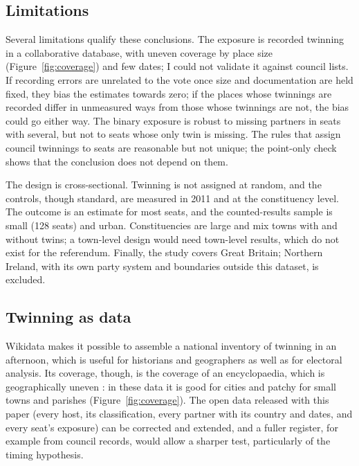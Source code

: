 \documentclass[11pt,a4paper]{article}
\begin{document}
\subsection{Limitations}
Several limitations qualify these conclusions. The exposure is recorded twinning in a collaborative database, with uneven coverage by place size (Figure~\ref{fig:coverage}) and few dates; I could not validate it against council lists. If recording errors are unrelated to the vote once size and documentation are held fixed, they bias the estimates towards zero; if the places whose twinnings are recorded differ in unmeasured ways from those whose twinnings are not, the bias could go either way. The binary exposure is robust to missing partners in seats with several, but not to seats whose only twin is missing. The rules that assign council twinnings to seats are reasonable but not unique; the point-only check shows that the conclusion does not depend on them.

The design is cross-sectional. Twinning is not assigned at random, and the controls, though standard, are measured in 2011 and at the constituency level. The outcome is an estimate for most seats, and the counted-results sample is small (128 seats) and urban. Constituencies are large and mix towns with and without twins; a town-level design would need town-level results, which do not exist for the referendum. Finally, the study covers Great Britain; Northern Ireland, with its own party system and boundaries outside this dataset, is excluded.

\subsection{Twinning as data}
Wikidata makes it possible to assemble a national inventory of twinning in an afternoon, which is useful for historians and geographers as well as for electoral analysis. Its coverage, though, is the coverage of an encyclopaedia, which is geographically uneven \citep{graham2014}: in these data it is good for cities and patchy for small towns and parishes (Figure~\ref{fig:coverage}). The open data released with this paper (every host, its classification, every partner with its country and dates, and every seat's exposure) can be corrected and extended, and a fuller register, for example from council records, would allow a sharper test, particularly of the timing hypothesis.
\end{document}
